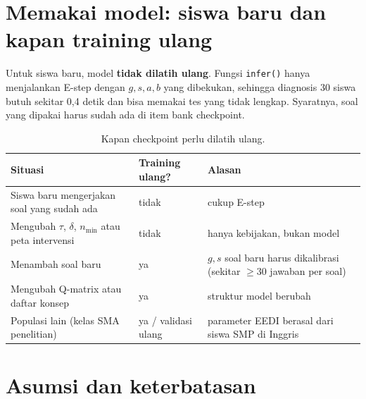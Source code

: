 \documentclass[11pt,a4paper]{article}
\begin{document}
\section{Memakai model: siswa baru dan kapan training ulang}

Untuk siswa baru, model \textbf{tidak dilatih ulang}. Fungsi \texttt{infer()} hanya menjalankan E-step dengan
$g,s,a,b$ yang dibekukan, sehingga diagnosis 30 siswa butuh sekitar 0,4 detik dan bisa memakai tes yang tidak lengkap.
Syaratnya, soal yang dipakai harus sudah ada di item bank checkpoint.

\begin{table}[h]
  \centering\small
  \begin{tabularx}{\linewidth}{@{}L l L@{}}
    \toprule
    Situasi & Training ulang? & Alasan \\
    \midrule
    Siswa baru mengerjakan soal yang sudah ada & tidak & cukup E-step \\
    Mengubah $\tau$, $\delta$, $n_{\min}$ atau peta intervensi & tidak & hanya kebijakan, bukan model \\
    Menambah soal baru & ya & $g,s$ soal baru harus dikalibrasi (sekitar $\ge30$ jawaban per soal) \\
    Mengubah Q-matrix atau daftar konsep & ya & struktur model berubah \\
    Populasi lain (kelas SMA penelitian) & ya / validasi ulang & parameter EEDI berasal dari siswa SMP di Inggris \\
    \bottomrule
  \end{tabularx}
  \caption{Kapan checkpoint perlu dilatih ulang.}
\end{table}

\section{Asumsi dan keterbatasan}
\end{document}
